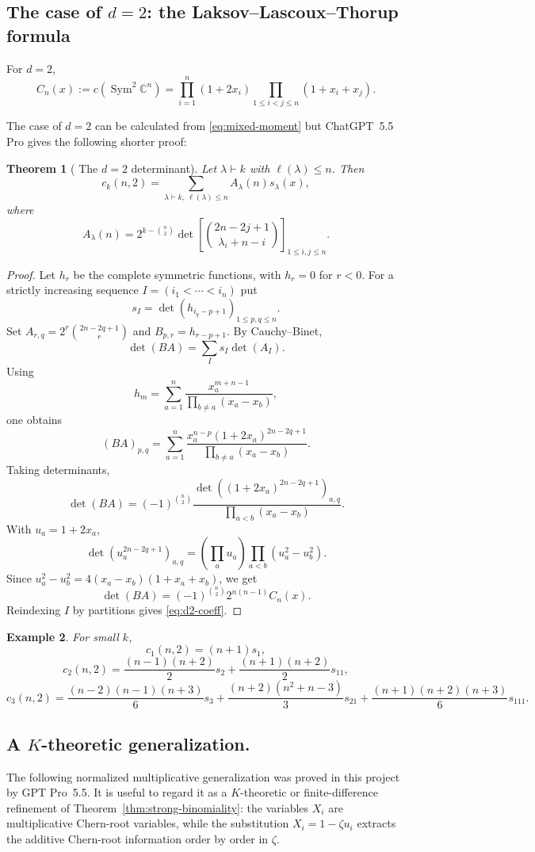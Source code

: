 \documentclass[10pt,a4paper]{amsart}
\numberwithin{equation}{section}
\newtheorem{theorem}{Theorem}[section]
\newtheorem{example}[theorem]{Example}
\DeclareMathOperator{\Sym}{Sym}
\newcommand{\C}{\mathbb C}
\begin{document}
\subsection{The case of $d=2$: the Laksov--Lascoux--Thorup formula}
\smallskip

For $d=2$,
\[
  C_n(x):=c(\Sym^2\C^n)=\prod_{i=1}^n(1+2x_i)\prod_{1\le i<j\le n}(1+x_i+x_j).
\]

The case of $d=2$ can be calculated from \eqref{eq:mixed-moment} but ChatGPT~5.5 Pro gives the following shorter proof:



\begin{theorem}[ \cite{LLT} The $d=2$ determinant]\label{thm:d2det}
Let $\lambda\vdash k$ with $\ell(\lambda)\le n$.  Then
\[
  c_k(n,2)=\sum_{\lambda\vdash k,\ \ell(\lambda)\le n}A_\lambda(n)s_\lambda(x),
\]
where
\begin{equation}\label{eq:d2-coeff}
  A_\lambda(n)=2^{k-\binom n2}
  \det\left[\binom{2n-2j+1}{\lambda_i+n-i}\right]_{1\le i,j\le n}.
\end{equation}
\end{theorem}

\begin{proof}
Let $h_r$ be the complete symmetric functions, with $h_r=0$ for $r<0$.  For a strictly increasing sequence $I=(i_1<\cdots<i_n)$ put
\[
  s_I=\det(h_{i_q-p+1})_{1\le p,q\le n}.
\]
Set $A_{r,q}=2^r\binom{2n-2q+1}{r}$ and $B_{p,r}=h_{r-p+1}$.  By Cauchy--Binet,
\[
  \det(BA)=\sum_I s_I\det(A_I).
\]
Using
\[
  h_m=\sum_{a=1}^n \frac{x_a^{m+n-1}}{\prod_{b\ne a}(x_a-x_b)},
\]
one obtains
\[
  (BA)_{p,q}=\sum_{a=1}^n
  \frac{x_a^{n-p}(1+2x_a)^{2n-2q+1}}{\prod_{b\ne a}(x_a-x_b)}.
\]
Taking determinants,
\[
  \det(BA)=(-1)^{\binom n2}
  \frac{\det((1+2x_a)^{2n-2q+1})_{a,q}}{\prod_{a<b}(x_a-x_b)}.
\]
With $u_a=1+2x_a$,
\[
  \det(u_a^{2n-2q+1})_{a,q}
  =\left(\prod_a u_a\right)\prod_{a<b}(u_a^2-u_b^2).
\]
Since $u_a^2-u_b^2=4(x_a-x_b)(1+x_a+x_b)$, we get
\[
  \det(BA)=(-1)^{\binom n2}2^{n(n-1)}C_n(x).
\]
Reindexing $I$ by partitions gives \eqref{eq:d2-coeff}.
\end{proof}

\begin{example}
For small $k$,
\[
  c_1(n,2)=(n+1)s_1,
\]
\[
  c_2(n,2)=\frac{(n-1)(n+2)}2s_2+\frac{(n+1)(n+2)}2s_{11},
\]
\[
  c_3(n,2)=\frac{(n-2)(n-1)(n+3)}6s_3+
  \frac{(n+2)(n^2+n-3)}3s_{21}
  +\frac{(n+1)(n+2)(n+3)}6s_{111}.
\]
\end{example}

\medskip
\subsection{A $K$-theoretic generalization.}
The following normalized multiplicative generalization
was proved in this project by GPT Pro~5.5.  It is useful to regard it as a $K$-theoretic or finite-difference refinement of Theorem~\ref{thm:strong-binomiality}: the variables $X_i$ are multiplicative Chern-root variables, while the substitution $X_i=1-\zeta u_i$ extracts the additive Chern-root information order by order in $\zeta$.
\end{document}

